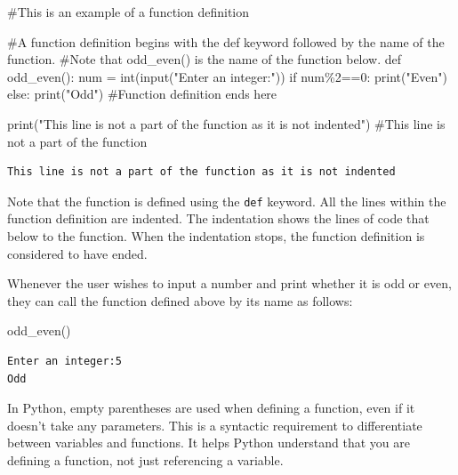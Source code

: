 \documentclass[
  letterpaper,
  DIV=11,
  numbers=noendperiod]{scrreprt}
\newenvironment{Shaded}{\begin{snugshade}}{\end{snugshade}}
\newcommand{\BuiltInTok}[1]{\textcolor[rgb]{0.00,0.23,0.31}{#1}}
\newcommand{\CommentTok}[1]{\textcolor[rgb]{0.37,0.37,0.37}{#1}}
\newcommand{\ControlFlowTok}[1]{\textcolor[rgb]{0.00,0.23,0.31}{#1}}
\newcommand{\DecValTok}[1]{\textcolor[rgb]{0.68,0.00,0.00}{#1}}
\newcommand{\KeywordTok}[1]{\textcolor[rgb]{0.00,0.23,0.31}{#1}}
\newcommand{\NormalTok}[1]{\textcolor[rgb]{0.00,0.23,0.31}{#1}}
\newcommand{\OperatorTok}[1]{\textcolor[rgb]{0.37,0.37,0.37}{#1}}
\newcommand{\StringTok}[1]{\textcolor[rgb]{0.13,0.47,0.30}{#1}}
\begin{document}
\begin{Shaded}
\begin{Highlighting}[]
\CommentTok{\#This is an example of a function definition}

\CommentTok{\#A function definition begins with the \textquotesingle{}def\textquotesingle{} keyword followed by the name of the function.}
\CommentTok{\#Note that \textquotesingle{}odd\_even()\textquotesingle{} is the name of the function below.}
\KeywordTok{def}\NormalTok{ odd\_even():           }
\NormalTok{    num }\OperatorTok{=} \BuiltInTok{int}\NormalTok{(}\BuiltInTok{input}\NormalTok{(}\StringTok{"Enter an integer:"}\NormalTok{))}
    \ControlFlowTok{if}\NormalTok{ num}\OperatorTok{\%}\DecValTok{2}\OperatorTok{==}\DecValTok{0}\NormalTok{:}
        \BuiltInTok{print}\NormalTok{(}\StringTok{"Even"}\NormalTok{)}
    \ControlFlowTok{else}\NormalTok{:}
        \BuiltInTok{print}\NormalTok{(}\StringTok{"Odd"}\NormalTok{)   }\CommentTok{\#Function definition ends here}
        
\BuiltInTok{print}\NormalTok{(}\StringTok{"This line is not a part of the function as it is not indented"}\NormalTok{) }\CommentTok{\#This line is not a part of the function}
\end{Highlighting}
\end{Shaded}

\begin{verbatim}
This line is not a part of the function as it is not indented
\end{verbatim}

Note that the function is defined using the \texttt{def} keyword. All
the lines within the function definition are indented. The indentation
shows the lines of code that below to the function. When the indentation
stops, the function definition is considered to have ended.

Whenever the user wishes to input a number and print whether it is odd
or even, they can call the function defined above by its name as
follows:

\begin{Shaded}
\begin{Highlighting}[]
\NormalTok{odd\_even()}
\end{Highlighting}
\end{Shaded}

\begin{verbatim}
Enter an integer:5
Odd
\end{verbatim}

In Python, empty parentheses are used when defining a function, even if
it doesn't take any parameters. This is a syntactic requirement to
differentiate between variables and functions. It helps Python
understand that you are defining a function, not just referencing a
variable.
\end{document}
